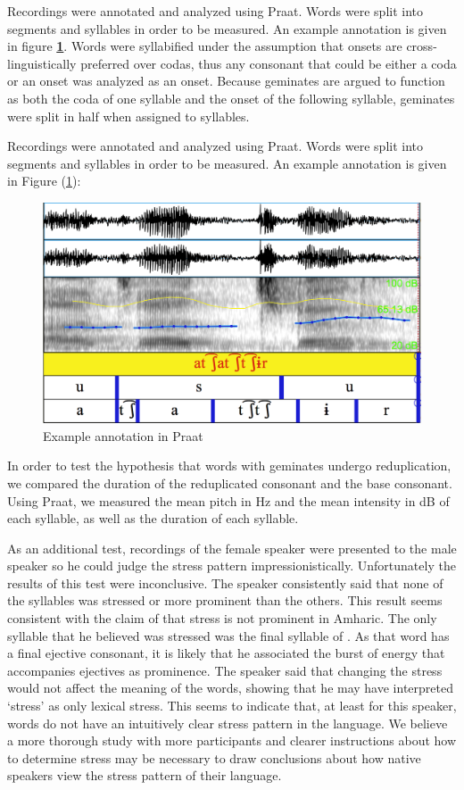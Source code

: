 \documentclass[12pt]{scrartcl}
\begin{document}
Recordings were annotated and analyzed using Praat. Words were split into segments and syllables in order to be measured. An example annotation is given in figure \textbf{\ref{fig:annotate}}. Words were syllabified under the assumption that onsets are cross-linguistically preferred over codas, thus any consonant that could be either a coda or an onset was analyzed as an onset. Because geminates are argued to function as both the coda of one syllable and the onset of the following syllable, geminates were split in half when assigned to syllables.

Recordings were annotated and analyzed using Praat. Words were split into segments and syllables in order to be measured. An example annotation is given in Figure (\ref{fig:annotate}):

\begin{figure}[h]
	\centering
	\caption{Example annotation in Praat \label{fig:annotate}}
	\includegraphics[width=.8\textwidth]{exann.png}
\end{figure}

In order to test the hypothesis that words with geminates undergo reduplication, we compared the duration of the reduplicated consonant and the base consonant. Using Praat, we measured the mean pitch in Hz and the mean intensity in dB of each syllable, as well as the duration of each syllable.

As an additional test, recordings of the female speaker were presented to the male speaker so he could judge the stress pattern impressionistically. Unfortunately the results of this test were inconclusive. The speaker consistently said that none of the syllables was stressed or more prominent than the others. This result seems consistent with the claim of \cite{hudson1997} that stress is not prominent in Amharic. The only syllable that he believed was stressed was the final syllable of \emph{}. As that word has a final ejective consonant, it is likely that he associated the burst of energy that accompanies ejectives as prominence. The speaker said that changing the stress would not affect the meaning of the words, showing that he may have interpreted `stress' as only lexical stress. This seems to indicate that, at least for this speaker, words do not have an intuitively clear stress pattern in the language. We believe a more thorough study with more participants and clearer instructions about how to determine stress may be necessary to draw conclusions about how native speakers view the stress pattern of their language. 
\end{document}
